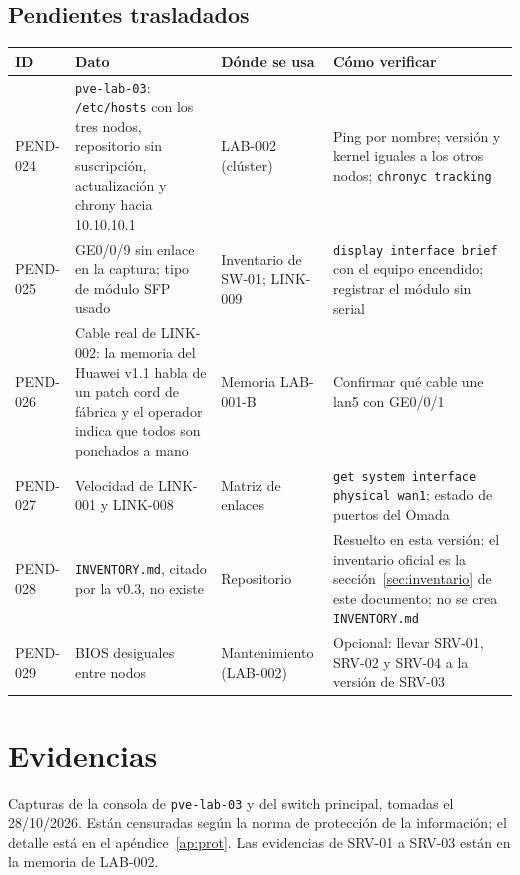 \documentclass[11pt,a4paper]{article}
\begin{document}
\subsection{Pendientes trasladados}\label{sec:pendientes}
{\small
\begin{longtable}{L{1.6cm} L{5.0cm} L{3.3cm} L{4.7cm}}
  \toprule
  \textbf{ID} & \textbf{Dato} & \textbf{Dónde se usa} & \textbf{Cómo verificar}\\
  \midrule
  \endhead
  PEND-024 & \texttt{pve-lab-03}: \texttt{/etc/hosts} con los tres nodos, repositorio sin suscripción, actualización y chrony hacia 10.10.10.1 & LAB-002 (clúster) & Ping por nombre; versión y kernel iguales a los otros nodos; \texttt{chronyc tracking}\\
  PEND-025 & GE0/0/9 sin enlace en la captura; tipo de módulo SFP usado & Inventario de SW-01; LINK-009 & \texttt{display interface brief} con el equipo encendido; registrar el módulo sin serial\\
  PEND-026 & Cable real de LINK-002: la memoria del Huawei v1.1 habla de un patch cord de fábrica y el operador indica que todos son ponchados a mano & Memoria LAB-001-B & Confirmar qué cable une lan5 con GE0/0/1\\
  PEND-027 & Velocidad de LINK-001 y LINK-008 & Matriz de enlaces & \texttt{get system interface physical wan1}; estado de puertos del Omada\\
  PEND-028 & \texttt{INVENTORY.md}, citado por la v0.3, no existe & Repositorio & Resuelto en esta versión: el inventario oficial es la sección~\ref{sec:inventario} de este documento; no se crea \texttt{INVENTORY.md}\\
  PEND-029 & BIOS desiguales entre nodos & Mantenimiento (LAB-002) & Opcional: llevar SRV-01, SRV-02 y SRV-04 a la versión de SRV-03\\
  \bottomrule
\end{longtable}
}

\appendix
\renewcommand{\thesection}{\Alph{section}}
\titleformat{\section}{\Large\bfseries\color{navy}}{Apéndice \thesection.}{0.6em}{}

\clearpage
\section{Evidencias}\label{ap:evid}
Capturas de la consola de \texttt{pve-lab-03} y del switch principal, tomadas el 28/10/2026. Están censuradas según la norma de protección de la información; el detalle está en el apéndice~\ref{ap:prot}. Las evidencias de SRV-01 a SRV-03 están en la memoria de LAB-002.
\end{document}
